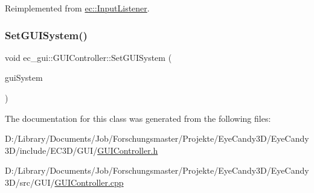 Reimplemented from \mbox{\hyperlink{classec_1_1_input_listener_a25ef07efb72ac5c880cbca876ddfe66a}{ec\+::\+Input\+Listener}}.

\mbox{\label{classec__gui_1_1_g_u_i_controller_a091b761c8d7cabf5c9c2af3d921cb58c}} 
\subsubsection{\texorpdfstring{Set\+G\+U\+I\+System()}{SetGUISystem()}}
{\footnotesize\ttfamily void ec\+\_\+gui\+::\+G\+U\+I\+Controller\+::\+Set\+G\+U\+I\+System (\begin{DoxyParamCaption}\item[{\mbox{\hyperlink{classec__gui_1_1_g_u_i_system}{G\+U\+I\+System}} $\ast$}]{gui\+System }\end{DoxyParamCaption})}



The documentation for this class was generated from the following files\+:\begin{DoxyCompactItemize}
\item 
D\+:/\+Library/\+Documents/\+Job/\+Forschungsmaster/\+Projekte/\+Eye\+Candy3\+D/\+Eye\+Candy3\+D/include/\+E\+C3\+D/\+G\+U\+I/\mbox{\hyperlink{_g_u_i_controller_8h}{G\+U\+I\+Controller.\+h}}\item 
D\+:/\+Library/\+Documents/\+Job/\+Forschungsmaster/\+Projekte/\+Eye\+Candy3\+D/\+Eye\+Candy3\+D/src/\+G\+U\+I/\mbox{\hyperlink{_g_u_i_controller_8cpp}{G\+U\+I\+Controller.\+cpp}}\end{DoxyCompactItemize}
